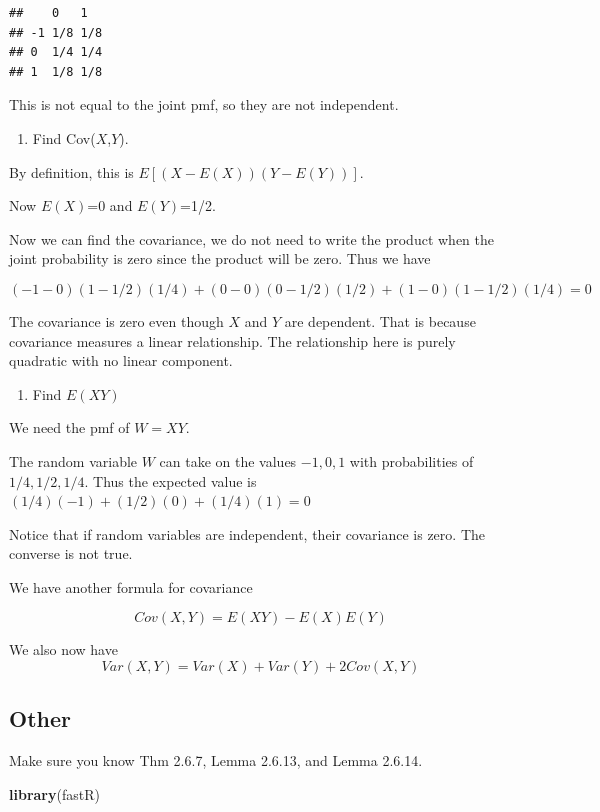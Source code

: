 \documentclass[]{book}
\newenvironment{Shaded}{\begin{snugshade}}{\end{snugshade}}
\newcommand{\KeywordTok}[1]{\textcolor[rgb]{0.13,0.29,0.53}{\textbf{#1}}}
\newcommand{\NormalTok}[1]{#1}
\providecommand{\tightlist}{%
  \setlength{\itemsep}{0pt}\setlength{\parskip}{0pt}}
\theoremstyle{definition}
\theoremstyle{definition}
\theoremstyle{definition}
\theoremstyle{remark}
\begin{document}
\begin{verbatim}
##    0   1  
## -1 1/8 1/8
## 0  1/4 1/4
## 1  1/8 1/8
\end{verbatim}

This is not equal to the joint pmf, so they are not independent.

\begin{enumerate}
\def\labelenumi{\arabic{enumi}.}
\setcounter{enumi}{1}
\tightlist
\item
  Find Cov(\(X\),\(Y\)).
\end{enumerate}

By definition, this is \(E[(X-E(X))(Y-E(Y))]\).

Now \(E(X)\)=0 and \(E(Y)\)=1/2.

Now we can find the covariance, we do not need to write the product when
the joint probability is zero since the product will be zero. Thus we
have

\[(-1-0)(1-1/2)(1/4)+(0-0)(0-1/2)(1/2)+(1-0)(1-1/2)(1/4)=0\]

The covariance is zero even though \(X\) and \(Y\) are dependent. That
is because covariance measures a linear relationship. The relationship
here is purely quadratic with no linear component.

\begin{enumerate}
\def\labelenumi{\arabic{enumi}.}
\setcounter{enumi}{2}
\tightlist
\item
  Find \(E(XY)\)
\end{enumerate}

We need the pmf of \(W=XY\).

The random variable \(W\) can take on the values \(-1,0,1\) with
probabilities of \(1/4,1/2,1/4\). Thus the expected value is
\((1/4)(-1)+(1/2)(0)+(1/4)(1)=0\)

Notice that if random variables are independent, their covariance is
zero. The converse is not true.

We have another formula for covariance

\[Cov(X,Y)=E(XY)-E(X)E(Y)\]

We also now have \[Var(X,Y)=Var(X)+Var(Y)+2Cov(X,Y)\]

\subsection{Other}\label{other}

Make sure you know Thm 2.6.7, Lemma 2.6.13, and Lemma 2.6.14.

\begin{Shaded}
\begin{Highlighting}[]
\KeywordTok{library}\NormalTok{(fastR)}
\end{Highlighting}
\end{Shaded}
\end{document}
